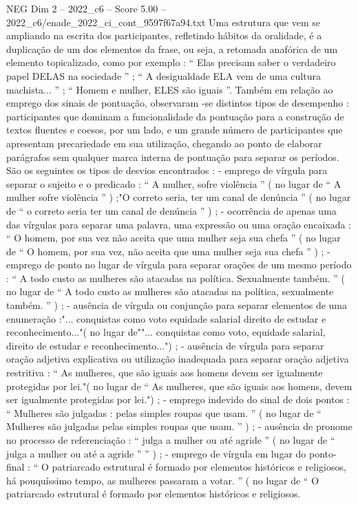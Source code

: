 \begin{textsample}{NEG Dim 2 – 2022\_c6 – Score 5.00 – 2022\_c6/enade\_2022\_ci\_cont\_9597f67a94.txt}
Uma estrutura que vem se ampliando na escrita dos participantes, refletindo hábitos da oralidade, é a duplicação de um dos elementos da frase, ou seja, a retomada anafórica de um elemento topicalizado, como por exemplo : “ Elas precisam saber o verdadeiro papel DELAS na sociedade ” ; “ A desigualdade ELA vem de uma cultura machista... ” ; “ Homem e mulher, ELES são iguais ”.
Também em relação ao emprego dos sinais de pontuação, observaram -se distintos tipos de desempenho : participantes que dominam a funcionalidade da pontuação para a construção de textos fluentes e coesos, por um lado, e um grande número de participantes que apresentam precariedade em sua utilização, chegando ao ponto de elaborar parágrafos sem qualquer marca interna de pontuação para separar os períodos.
São os seguintes os tipos de desvios encontrados : - emprego de vírgula para separar o sujeito e o predicado : “ A mulher, sofre violência ” ( no lugar de “ A mulher sofre violência ” ) ;"O correto seria, ter um canal de denúncia ” ( no lugar de “ o correto seria ter um canal de denúncia ” ) ; - ocorrência de apenas uma das vírgulas para separar uma palavra, uma expressão ou uma oração encaixada : “ O homem, por sua vez não aceita que uma mulher seja sua chefa ” ( no lugar de “ O homem, por sua vez, não aceita que uma mulher seja sua chefa ” ) ; - emprego de ponto no lugar de vírgula para separar orações de um mesmo período : “ A todo custo as mulheres são atacadas na política.
Sexualmente também. ” ( no lugar de “ A todo custo as mulheres são atacadas na política, sexualmente também. ” ) ; - ausência de vírgula ou conjunção para separar elementos de uma enumeração :"... conquistas como voto equidade salarial direito de estudar e reconhecimento..."( no lugar de""... conquistas como voto, equidade salarial, direito de estudar e reconhecimento...") ; - ausência de vírgula para separar oração adjetiva explicativa ou utilização inadequada para separar oração adjetiva restritiva : “ As mulheres, que são iguais aos homens devem ser igualmente protegidas por lei."( no lugar de “ As mulheres, que são iguais aos homens, devem ser igualmente protegidas por lei.") ; - emprego indevido do sinal de dois pontos : “ Mulheres são julgadas : pelas simples roupas que usam. ” ( no lugar de “ Mulheres são julgadas pelas simples roupas que usam. ” ) ; - ausência de pronome no processo de referenciação : “ julga a mulher ou até agride ” ( no lugar de “ julga a mulher ou até a agride ” ” ) ; - emprego de vírgula em lugar do ponto-final : “ O patriarcado estrutural é formado por elementos históricos e religiosos, há pouquíssimo tempo, as mulheres passaram a votar. ” ( no lugar de “ O patriarcado estrutural é formado por elementos históricos e religiosos.

\end{textsample}
